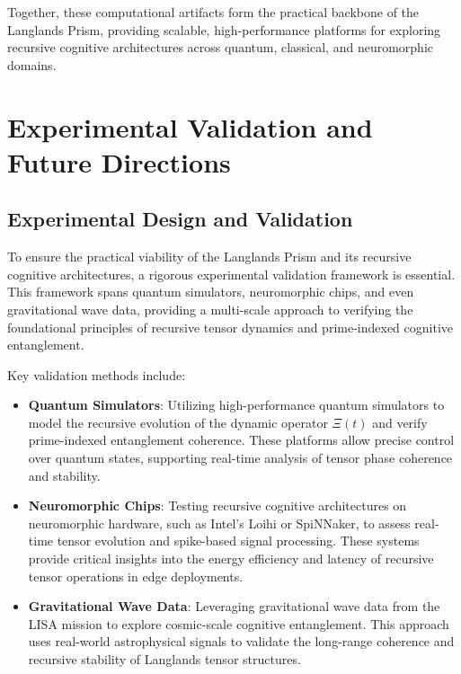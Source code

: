\documentclass[11pt]{article}
\begin{document}
Together, these computational artifacts form the practical backbone of the Langlands Prism, providing scalable, high-performance platforms for exploring recursive cognitive architectures across quantum, classical, and neuromorphic domains.

\section{Experimental Validation and Future Directions}

\subsection{Experimental Design and Validation}

To ensure the practical viability of the Langlands Prism and its recursive cognitive architectures, a rigorous experimental validation framework is essential. This framework spans quantum simulators, neuromorphic chips, and even gravitational wave data, providing a multi-scale approach to verifying the foundational principles of recursive tensor dynamics and prime-indexed cognitive entanglement.

Key validation methods include:

\begin{itemize}
    \item \textbf{Quantum Simulators}:
    Utilizing high-performance quantum simulators to model the recursive evolution of the dynamic operator \(\Xi(t)\) and verify prime-indexed entanglement coherence. These platforms allow precise control over quantum states, supporting real-time analysis of tensor phase coherence and stability.

    \item \textbf{Neuromorphic Chips}:
    Testing recursive cognitive architectures on neuromorphic hardware, such as Intel's Loihi or SpiNNaker, to assess real-time tensor evolution and spike-based signal processing. These systems provide critical insights into the energy efficiency and latency of recursive tensor operations in edge deployments.

    \item \textbf{Gravitational Wave Data}:
    Leveraging gravitational wave data from the LISA mission to explore cosmic-scale cognitive entanglement. This approach uses real-world astrophysical signals to validate the long-range coherence and recursive stability of Langlands tensor structures.
\end{itemize}
\end{document}
